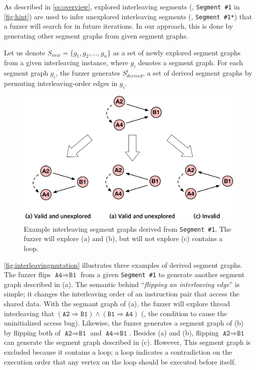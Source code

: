 %
As described in \autoref{ss:overview}, explored interleaving segments
(\eg, \texttt{Segment \#1} in \autoref{fig:hint}) are used to infer
unexplored interleaving segments (\eg, \texttt{Segment \#1*}) that a
fuzzer will search for in future iterations.
%
In our approach, this is done by generating other segment graphs from
given segment graphs.

Let us denote $S_{new} = \{g_1, g_2, ..., g_n \}$ as a set of newly
explored segment graphs from a given interleaving instance, where
$g_i$ denotes a segment graph.
%
For each segment graph $g_i$, the fuzzer generates $S^{i}_{derived}$,
a set of derived segment graphs by permuting interleaving-order edges
in $g_i$.


\begin{figure}[t]
  \centering
  \includegraphics[width=0.9\linewidth]{fig/interleavingmutation.pdf}
  \caption{Example interleaving segment graphs derived from
    \texttt{Segment \#1}. The fuzzer will explore (a) and (b), but
    will not explore (c) contains a loop.}
  \label{fig:interleavingmutation}
\end{figure}
%

\autoref{fig:interleavingmutation} illustrates three examples of
derived segment graphs.
%
The fuzzer flips $\texttt{A4} \Rightarrow \texttt{B1}$ from a given
\texttt{Segment \#1} to generate another segment graph described in
(a).
%
The semantic behind ``\textit{flipping an interleaving edge}'' is
simple; it changes the interleaving order of an instruction pair that
access the shared data.
%
With the segmant graph of (a), the fuzzer will explore thread
interleaving that
$(\texttt{A2} \Rightarrow \texttt{B1}) \wedge (\texttt{B1} \Rightarrow
\texttt{A4})$ (\ie, the condition to cause the uninitialized access
bug).
%
Likewise, the fuzzer generates a segment graph of (b) by flipping both
of $\texttt{A2} \Rightarrow \texttt{B1}$ and
$\texttt{A4} \Rightarrow \texttt{B1}$.
%
Besides (a) and (b), flipping $\texttt{A2} \Rightarrow \texttt{B1}$
can generate the segment graph described in (c). However, This segment
graph is excluded because it contains a loop; a loop indicates a
contradiction on the execution order that any vertex on the loop
should be executed before itself.



